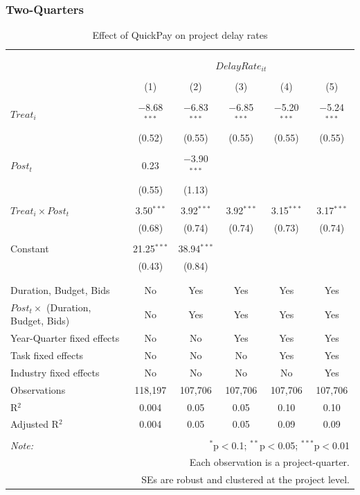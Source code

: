 \documentclass[
]{article}
\begin{document}
\hypertarget{two-quarters-2}{%
\subsubsection{Two-Quarters}\label{two-quarters-2}}

\begin{table}[H] \centering 
  \caption{Effect of QuickPay on project delay rates} 
  \label{} 
\small 
\begin{tabular}{@{\extracolsep{-2pt}}lccccc} 
\\[-1.8ex]\hline 
\hline \\[-1.8ex] 
\\[-1.8ex] & \multicolumn{5}{c}{$DelayRate_{it}$} \\ 
\\[-1.8ex] & (1) & (2) & (3) & (4) & (5)\\ 
\hline \\[-1.8ex] 
 $Treat_i$ & $-$8.68$^{***}$ & $-$6.83$^{***}$ & $-$6.85$^{***}$ & $-$5.20$^{***}$ & $-$5.24$^{***}$ \\ 
  & (0.52) & (0.55) & (0.55) & (0.55) & (0.55) \\ 
  & & & & & \\ 
 $Post_t$ & 0.23 & $-$3.90$^{***}$ &  &  &  \\ 
  & (0.55) & (1.13) &  &  &  \\ 
  & & & & & \\ 
 $Treat_i \times Post_t$ & 3.50$^{***}$ & 3.92$^{***}$ & 3.92$^{***}$ & 3.15$^{***}$ & 3.17$^{***}$ \\ 
  & (0.68) & (0.74) & (0.74) & (0.73) & (0.74) \\ 
  & & & & & \\ 
 Constant & 21.25$^{***}$ & 38.94$^{***}$ &  &  &  \\ 
  & (0.43) & (0.84) &  &  &  \\ 
  & & & & & \\ 
\hline \\[-1.8ex] 
Duration, Budget, Bids & No & Yes & Yes & Yes & Yes \\ 
$Post_t \times$  (Duration, Budget, Bids) & No & Yes & Yes & Yes & Yes \\ 
Year-Quarter fixed effects & No & No & Yes & Yes & Yes \\ 
Task fixed effects & No & No & No & Yes & Yes \\ 
Industry fixed effects & No & No & No & No & Yes \\ 
Observations & 118,197 & 107,706 & 107,706 & 107,706 & 107,706 \\ 
R$^{2}$ & 0.004 & 0.05 & 0.05 & 0.10 & 0.10 \\ 
Adjusted R$^{2}$ & 0.004 & 0.05 & 0.05 & 0.09 & 0.09 \\ 
\hline 
\hline \\[-1.8ex] 
\textit{Note:}  & \multicolumn{5}{r}{$^{*}$p$<$0.1; $^{**}$p$<$0.05; $^{***}$p$<$0.01} \\ 
 & \multicolumn{5}{r}{Each observation is a project-quarter.} \\ 
 & \multicolumn{5}{r}{SEs are robust and clustered at the project level.} \\ 
\end{tabular} 
\end{table}
\end{document}
